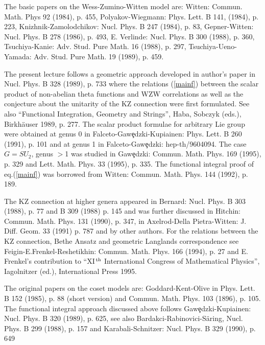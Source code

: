 \vskip 0.4cm

The basic papers on the Wess-Zumino-Witten model are:
Witten: Commun. Math. Phys 92 (1984), p. 455,
\m Polyakov-Wiegmann: Phys. Lett. B 141, (1984), p. 223,
\m Knizhnik-Zamolodchikov: Nucl. Phys. B 247 (1984), p. 83,
\m Gepner-Witten: Nucl. Phys. B 278 (1986), p. 493,
\m E. Verlinde: Nucl. Phys. B 300 (1988), p. 360,
\m Tsuchiya-Kanie: Adv. Stud. Pure Math. 16 (1988),
p. 297, \s Tsuchiya-Ueno-Yamada: Adv. Stud. Pure Math. 19
(1989), p. 459.
\vskip 0.3cm

The present lecture follows a geometric approach developed
in author's paper in Nucl. Phys. B 328 (1989),
p. 733 where the relations (\ref{mainf}) between the scalar
product of non-abelian theta functions and WZW
correlations as well as the conjecture about
the unitarity of the KZ connection were first
formulated. See also ``Functional Integration, Geometry
and Strings'', Haba, Sobczyk (eds.),
Birkh\"{a}user 1989, p. 277. The scalar product
formulae for arbitrary Lie group were
obtained at genus 0 in Falceto-Gaw\c{e}dzki-Kupiainen:
Phys. Lett. B 260 (1991), p. 101 \s and at genus 1
in Falceto-Gaw\c{e}dzki: hep-th/9604094.
The case $G=SU_2$, genus $>$1 was studied in Gaw\c{e}dzki:
Commun. Math. Phys. 169 (1995), p. 329 \s and Lett. Math. Phys.
33 (1995), p. 335.
\s The functional integral proof of eq.\s\s(\ref{mainf})
was borrowed from Witten: Commun. Math. Phys. 144 (1992),
p. 189.
\vskip 0.3cm

The KZ connection at higher genera appeared in
Bernard: Nucl. Phys. B 303 (1988), p. 77 and B 309 (1988) p. 145
and was further discussed in Hitchin: Commun. Math. Phys.
131 (1990), p. 347, \s in Axelrod-Della Pietra-Witten:
J. Diff. Geom. 33 (1991) p. 787 and by other authors.
For the relations between the KZ connection,
Bethe Ansatz and geometric Langlands correspondence
see Feigin-E.\m Frenkel-Reshetikhin: Commun. Math. Phys. 166 (1994),
p. 27 and E. Frenkel's contribution to ``XI$^{\rm\hspace{0.025cm} th}$
International Congress of Mathematical Physics'', Iagolnitzer (ed.),
International Press 1995.
\vskip 0.3cm

The original papers on the coset models are:
Goddard-Kent-Olive in Phys. Lett. B 152 (1985), p. 88
(short version) and Commun. Math. Phys. 103 (1896), p. 105.
The functional integral approach discussed above follows
Gaw\c{e}dzki-Kupiainen: Nucl. Phys. B 320 (1989), p. 625,
see also Bardakci-Rabinovici-S\"{a}ring, Nucl. Phys. B 299 (1988),
p. 157 \s and Karabali-Schnitzer: Nucl. Phys. B 329 (1990), p. 649
\vskip 0.3cm

